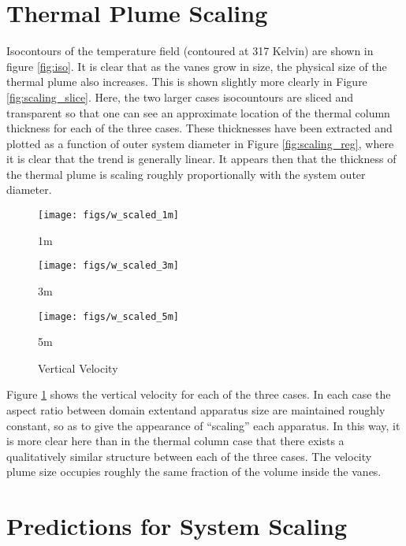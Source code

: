 \documentclass[english]{article}
\begin{document}
\section*{Thermal Plume Scaling}

Isocontours of the temperature field (contoured at 317 Kelvin) are shown in figure \ref{fig:iso}. 
It is clear that as the vanes grow in size, the physical size of the
thermal plume also increases. This is shown slightly more clearly in
Figure \ref{fig:scaling_slice}. Here, the two larger cases isocountours
are sliced and transparent so that one can see an approximate location
of the thermal column thickness for each of the three cases. These
thicknesses have been extracted and plotted as a function of outer
system diameter in Figure \ref{fig:scaling_reg}, where it is clear that
the trend is generally linear. It appears then that the thickness of the
thermal plume is scaling roughly proportionally with the system outer
diameter.  

%
%


\begin{figure}[!htb]
\texttt{[image: figs/w\_scaled\_1m]}
\caption*{1m}\label{fig:1m_vz}
\endminipage\hfill
{}
\texttt{[image: figs/w\_scaled\_3m]}
\caption*{3m}\label{fig:3m_vz}
\endminipage\hfill
{}%
\texttt{[image: figs/w\_scaled\_5m]}
  \caption*{5m}\label{fig:5m_vz}
\endminipage
\caption{Vertical Velocity}
\label{fig:vz_scaling}
\end{figure}
 
Figure \ref{fig:vz_scaling} shows the vertical velocity for each of the
three cases. In each case the aspect ratio between domain extentand
apparatus size are maintained roughly constant, so as to give the
appearance of ``scaling'' each apparatus. In this way, it is more clear
here than in the thermal column case that there exists a qualitatively
similar structure between each of the three cases. The velocity plume
size occupies roughly the same fraction of the volume inside the vanes.  

%
%
%
\section*{Predictions for System Scaling}

\end{document}
